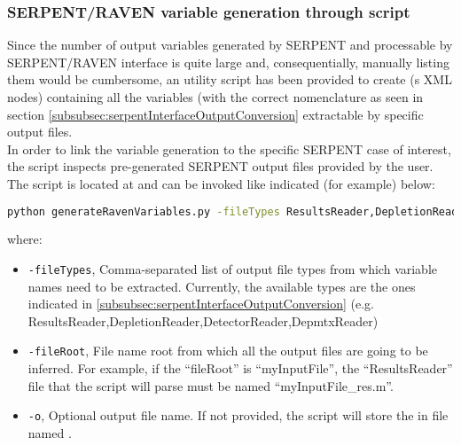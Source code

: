 \subsubsection{SERPENT/RAVEN variable generation through script}
Since the number of output variables generated by SERPENT and processable by SERPENT/RAVEN interface is quite large and,
consequentially, manually listing them would be cumbersome, 
an utility script has been provided to create   (s XML nodes) containing all the
variables (with the correct nomenclature as seen in section \ref{subsubsec:serpentInterfaceOutputConversion} extractable by
specific output files.
\\In order to link the variable generation to the specific SERPENT case of interest, the script inspects pre-generated SERPENT output files
provided by the user.
\\The script is located at  and
can be invoked like indicated (for example) below:
\begin{lstlisting}[language=bash]
python generateRavenVariables.py -fileTypes ResultsReader,DepletionReader,DetectorReader,DepmtxReader   -fileRoot mySerpentInputFile -o myOptionalScriptOutputFilename
\end{lstlisting}
where:
\begin{itemize}
\item  \texttt{-fileTypes}, Comma-separated list of output file types from which variable names need to be extracted. 
                                     Currently, the available types  are the ones indicated in \ref{subsubsec:serpentInterfaceOutputConversion} 
                                     (e.g. ResultsReader,DepletionReader,DetectorReader,DepmtxReader)
\item  \texttt{-fileRoot}, File name root from which all the output files are going to be inferred. 
                                    For example, if the ``fileRoot'' is ``myInputFile'', the ``ResultsReader'' file that the script will parse
                                    must be named ``myInputFile\_res.m''.
\item  \texttt{-o}, Optional output file name. If not provided, the script will store the   in file named .
\end{itemize}


